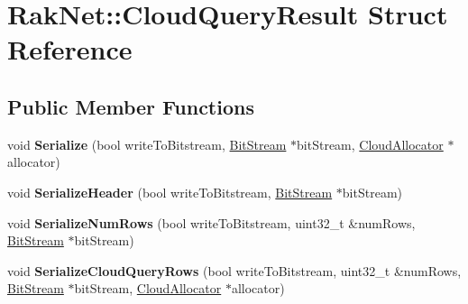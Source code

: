 \hypertarget{struct_rak_net_1_1_cloud_query_result}{\section{Rak\-Net\-:\-:Cloud\-Query\-Result Struct Reference}
\label{struct_rak_net_1_1_cloud_query_result}
}
\subsection*{Public Member Functions}
\begin{DoxyCompactItemize}
\item 
\hypertarget{struct_rak_net_1_1_cloud_query_result_aad1eb80e571b21fadf6f11cc931db858}{void {\bfseries Serialize} (bool write\-To\-Bitstream, \hyperlink{class_rak_net_1_1_bit_stream}{Bit\-Stream} $\ast$bit\-Stream, \hyperlink{class_rak_net_1_1_cloud_allocator}{Cloud\-Allocator} $\ast$allocator)}\label{struct_rak_net_1_1_cloud_query_result_aad1eb80e571b21fadf6f11cc931db858}

\item 
\hypertarget{struct_rak_net_1_1_cloud_query_result_af4e1e11366d3eb29b8c070bfc2afa6b2}{void {\bfseries Serialize\-Header} (bool write\-To\-Bitstream, \hyperlink{class_rak_net_1_1_bit_stream}{Bit\-Stream} $\ast$bit\-Stream)}\label{struct_rak_net_1_1_cloud_query_result_af4e1e11366d3eb29b8c070bfc2afa6b2}

\item 
\hypertarget{struct_rak_net_1_1_cloud_query_result_a3398bf5f8a624a03095d505d8540e588}{void {\bfseries Serialize\-Num\-Rows} (bool write\-To\-Bitstream, uint32\-\_\-t \&num\-Rows, \hyperlink{class_rak_net_1_1_bit_stream}{Bit\-Stream} $\ast$bit\-Stream)}\label{struct_rak_net_1_1_cloud_query_result_a3398bf5f8a624a03095d505d8540e588}

\item 
\hypertarget{struct_rak_net_1_1_cloud_query_result_aa2908fcc2e68c9cc48e6a73bdae5eb76}{void {\bfseries Serialize\-Cloud\-Query\-Rows} (bool write\-To\-Bitstream, uint32\-\_\-t \&num\-Rows, \hyperlink{class_rak_net_1_1_bit_stream}{Bit\-Stream} $\ast$bit\-Stream, \hyperlink{class_rak_net_1_1_cloud_allocator}{Cloud\-Allocator} $\ast$allocator)}\label{struct_rak_net_1_1_cloud_query_result_aa2908fcc2e68c9cc48e6a73bdae5eb76}

\end{DoxyCompactItemize}
